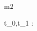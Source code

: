 \documentclass[12pt]{amsart}
\begin{document}
\begin{machine}{m2}


%
%
%
%
%
\begin{dummy}
	t_0,t_1 : \Train
\end{dummy}
%
%
%
%
%
%
%
%

\end{machine}
\end{document}
